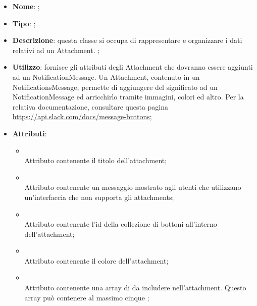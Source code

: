 \begin{itemize}
	\item \textbf{Nome}: ;
	\item \textbf{Tipo}: ;
	\item \textbf{Descrizione}: questa classe si occupa di rappresentare e organizzare i dati relativi ad un Attachment.
;
	\item \textbf{Utilizzo}: fornisce gli attributi degli Attachment che dovranno essere aggiunti ad un NotificationMessage.
Un Attachment, contenuto in un NotificationsMessage, permette di aggiungere del significato ad un NotificationMessage ed arricchirlo tramite immagini, colori ed altro.
Per la relativa documentazione, consultare questa pagina \url{https://api.slack.com/docs/message-buttons};
	\item \textbf{Attributi}:
	\begin{itemize}
		\item[]  \\
		Attributo contenente il titolo dell'attachment;
		\item[]  \\
		Attributo contenente un messaggio mostrato agli utenti che utilizzano un'interfaccia che non supporta gli attachments;
		\item[]  \\
		Attributo contenente l'id della collezione di bottoni all'interno dell'attachment;
		\item[]  \\
		Attributo contenente il colore dell'attachment;
		\item[]  \\
		Attributo contenente una array di  da includere nell'attachment. Questo array può contenere al massimo cinque ;
	\end{itemize}
\end{itemize}

